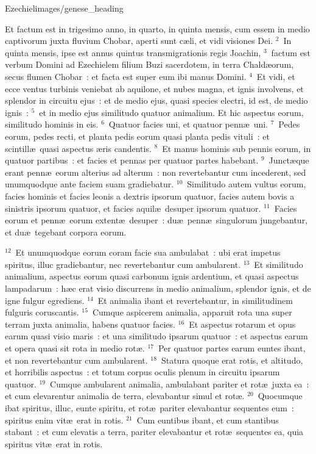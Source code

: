 {Ezechiel}{images/genese_heading}


\lettrine[lines=10,image=true,loversize=0.05,lraise=-0.03]{E}{}t factum est in trigesimo anno, in quarto, in quinta mensis, cum essem in medio captivorum juxta fluvium Chobar, aperti sunt c\ae li, et vidi visiones Dei.
${}^{2}$~In quinta mensis, ipse est annus quintus transmigrationis regis Joachin,
${}^{3}$~factum est verbum Domini ad Ezechielem filium Buzi sacerdotem, in terra Chald\ae orum, secus flumen Chobar~: et facta est super eum ibi manus Domini.
${}^{4}$~Et vidi, et ecce ventus turbinis veniebat ab aquilone, et nubes magna, et ignis involvens, et splendor in circuitu ejus~: et de medio ejus, quasi species electri, id est, de medio ignis~:
${}^{5}$~et in medio ejus similitudo quatuor animalium. Et hic aspectus eorum, similitudo hominis in eis.
${}^{6}$~Quatuor facies uni, et quatuor penn\ae\ uni.
${}^{7}$~Pedes eorum, pedes recti, et planta pedis eorum quasi planta pedis vituli~: et scintill\ae\ quasi aspectus \ae ris candentis.
${}^{8}$~Et manus hominis sub pennis eorum, in quatuor partibus~: et facies et pennas per quatuor partes habebant.
${}^{9}$~Junct\ae que erant penn\ae\ eorum alterius ad alterum~: non revertebantur cum incederent, sed unumquodque ante faciem suam gradiebatur.
${}^{10}$~Similitudo autem vultus eorum, facies hominis et facies leonis a dextris ipsorum quatuor, facies autem bovis a sinistris ipsorum quatuor, et facies aquil\ae\ desuper ipsorum quatuor.
${}^{11}$~Facies eorum et penn\ae\ eorum extent\ae\ desuper~: du\ae\ penn\ae\ singulorum jungebantur, et du\ae\ tegebant corpora eorum.


${}^{12}$~Et unumquodque eorum coram facie sua ambulabat~: ubi erat impetus spiritus, illuc gradiebantur, nec revertebantur cum ambularent.
${}^{13}$~Et similitudo animalium, aspectus eorum quasi carbonum ignis ardentium, et quasi aspectus lampadarum~: h\ae c erat visio discurrens in medio animalium, splendor ignis, et de igne fulgur egrediens.
${}^{14}$~Et animalia ibant et revertebantur, in similitudinem fulguris coruscantis.
${}^{15}$~Cumque aspicerem animalia, apparuit rota una super terram juxta animalia, habens quatuor facies.
${}^{16}$~Et aspectus rotarum et opus earum quasi visio maris~: et una similitudo ipsarum quatuor~: et aspectus earum et opera quasi sit rota in medio rot\ae .
${}^{17}$~Per quatuor partes earum euntes ibant, et non revertebantur cum ambularent.
${}^{18}$~Statura quoque erat rotis, et altitudo, et horribilis aspectus~: et totum corpus oculis plenum in circuitu ipsarum quatuor.
${}^{19}$~Cumque ambularent animalia, ambulabant pariter et rot\ae\ juxta ea~: et cum elevarentur animalia de terra, elevabantur simul et rot\ae .
${}^{20}$~Quocumque ibat spiritus, illuc, eunte spiritu, et rot\ae\ pariter elevabantur sequentes eum~: spiritus enim vit\ae\ erat in rotis.
${}^{21}$~Cum euntibus ibant, et cum stantibus stabant~: et cum elevatis a terra, pariter elevabantur et rot\ae\ sequentes ea, quia spiritus vit\ae\ erat in rotis.


